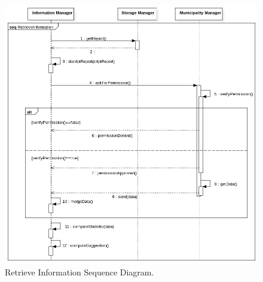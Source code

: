 \documentclass{report}
\begin{document}
\newpage
\begin{figure}[ht!]
\begin{center}
\includegraphics[width=\textwidth]{./img/RetrieveSd.png}
\end{center}
\caption{Retrieve Information Sequence Diagram.}
\label{fig:SequenceDiagram4}
\end{figure}

\newpage 
\end{document}
